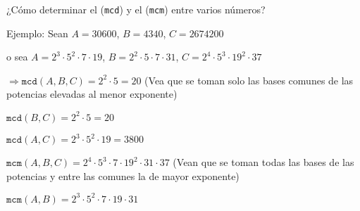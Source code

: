 ¿Cómo determinar el (\texttt{mcd}) y el (\texttt{mcm}) entre varios números?

Ejemplo: Sean $A=30600$, $B=4340$, $C=2674200$

\hspace{1.6cm}o sea $A=2^3\cdot5^2\cdot7\cdot19$, $B=2^2\cdot5\cdot7\cdot31$, $C=2^4\cdot5^3\cdot19^2\cdot37$

$\Longrightarrow \texttt{mcd}(A,B,C)=2^2\cdot5=20$ (Vea que se toman solo las bases comunes de las potencias elevadas al menor exponente)

\hspace{.8cm}$\texttt{mcd}(B,C)=2^2\cdot5=20$

\hspace{.8cm}$\texttt{mcd}(A,C)=2^3\cdot5^2\cdot19=3800$

\hspace{.8cm}$\texttt{mcm}(A,B,C)=2^4\cdot5^3\cdot7\cdot19^2\cdot31\cdot37$ (Vean que se toman todas las bases de las potencias y entre las comunes la de mayor exponente)

\hspace{.8cm}$\texttt{mcm}(A,B)=2^3\cdot5^2\cdot7\cdot19\cdot31$

\vspace{0.5cm}


